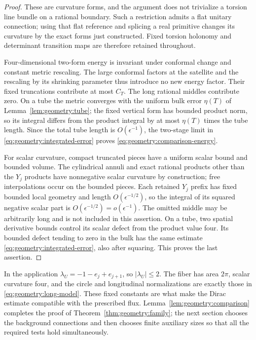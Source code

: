 \begin{proof}
These are curvature forms, and the argument does
not trivialize a torsion line bundle on a rational
boundary.  Such a restriction admits a flat unitary
connection; using that flat reference and splicing
a real primitive changes its curvature by the
exact forms just constructed.  Fixed torsion
holonomy and determinant transition maps are
therefore retained throughout.

Four-dimensional two-form energy is invariant under
conformal change and constant metric rescaling.
The large conformal factors at the satellite and
the rescaling by its shrinking parameter thus
introduce no new energy factor.  Their fixed
truncations contribute at most $C_T$.  The long
rational middles contribute zero.  On a tube the
metric converges with the uniform bulk error
$\eta(T)$ of Lemma~\ref{lem:geometry:tube}; the fixed
vertical form has bounded product norm, so its
integral differs from the product integral by at
most $\eta(T)$ times the tube length.  Since the
total tube length is $O(\epsilon^{-1})$, the
two-stage limit in \eqref{eq:geometry:integrated-error}
proves \eqref{eq:geometry:comparison-energy}.

For scalar curvature, compact truncated pieces
have a uniform scalar bound and bounded volume.
The cylindrical annuli and exact rational
products other than the $Y_j$ products have nonnegative
scalar curvature by construction; free interpolations
occur on the bounded pieces.  Each retained $Y_j$
prefix has fixed bounded local geometry and length
$O(\epsilon^{-1/2})$, so the integral of its squared
negative scalar part is $O(\epsilon^{-1/2})
=o(\epsilon^{-1})$.  The omitted middle may be
arbitrarily long and is not included in this assertion.
On a tube, two spatial derivative
bounds control its scalar defect from the product
value four.  Its bounded defect tending to zero
in the bulk has the same estimate
\eqref{eq:geometry:integrated-error}, also after
squaring.  This proves the last assertion.
\end{proof}

In the application $\lambda_U=-1-e_j+e_{j+1}$, so
$|\lambda_U|\le2$.  The fiber has area $2\pi$, scalar
curvature four, and the circle and longitudinal
normalizations are exactly those in
\eqref{eq:geometry:long-model}.  These fixed constants
are what make the Dirac estimate compatible with
the prescribed flux.  Lemma~\ref{lem:geometry:comparison}
completes the proof of Theorem~\ref{thm:geometry:family};
the next section chooses the background connections
and then chooses finite auxiliary sizes so that all
the required tests hold simultaneously.
